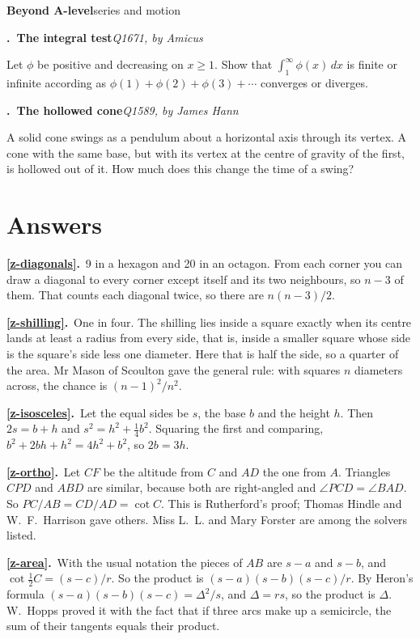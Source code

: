 \documentclass[11pt,a4paper]{article}
\newcounter{prob}
\newcommand{\prob}[3]{\par\bigskip\refstepcounter{prob}\label{#1}%
  \noindent\textbf{\theprob.\ #2}\hfill{\small\textit{#3}}\par\nopagebreak\smallskip}
\newcommand{\ans}[2]{\par\smallskip\noindent\textbf{\ref{#1}.}\ #2}
\newcommand{\band}[3]{%
  \clearpage
  \begin{tcolorbox}[colback=#1!12,colframe=#1,boxrule=1pt,arc=2pt]
  {\Large\bfseries\color{#1} #2}\hfill{\large #3}
  \end{tcolorbox}}
\begin{document}
\band{bandgrey}{Beyond A-level}{series and motion}

\prob{z-test}{The integral test}{Q1671, by Amicus}
Let $\phi$ be positive and decreasing on $x \ge 1$. Show that $\int_1^\infty\phi(x)\,dx$ is
finite or infinite according as $\phi(1) + \phi(2) + \phi(3) + \cdots$ converges or
diverges.

\prob{z-hollow}{The hollowed cone}{Q1589, by James Hann}
A solid cone swings as a pendulum about a horizontal axis through its vertex. A cone with
the same base, but with its vertex at the centre of gravity of the first, is hollowed out
of it. How much does this change the time of a swing?

\clearpage
\section*{Answers}

\ans{z-diagonals}{9 in a hexagon and 20 in an octagon. From each corner you can draw a
diagonal to every corner except itself and its two neighbours, so $n - 3$ of them. That
counts each diagonal twice, so there are $n(n-3)/2$.}

\ans{z-shilling}{One in four. The shilling lies inside a square exactly when its centre
lands at least a radius from every side, that is, inside a smaller square whose side is
the square's side less one diameter. Here that is half the side, so a quarter of the
area. Mr Mason of Scoulton gave the general rule: with squares $n$ diameters across, the
chance is $(n-1)^2/n^2$.}

\ans{z-isosceles}{Let the equal sides be $s$, the base $b$ and the height $h$. Then
$2s = b + h$ and $s^2 = h^2 + \tfrac14b^2$. Squaring the first and comparing,
$b^2 + 2bh + h^2 = 4h^2 + b^2$, so $2b = 3h$.}

\ans{z-ortho}{Let $CF$ be the altitude from $C$ and $AD$ the one from $A$. Triangles $CPD$
and $ABD$ are similar, because both are right-angled and $\angle PCD = \angle BAD$. So
$PC/AB = CD/AD = \cot C$. This is Rutherford's proof; Thomas Hindle and W.~F.~Harrison
gave others. Miss L.~L. and Mary Forster are among the solvers listed.}

\ans{z-area}{With the usual notation the pieces of $AB$ are $s-a$ and $s-b$, and
$\cot\tfrac12C = (s-c)/r$. So the product is $(s-a)(s-b)(s-c)/r$. By Heron's formula
$(s-a)(s-b)(s-c) = \Delta^2/s$, and $\Delta = rs$, so the product is $\Delta$. W.~Hopps
proved it with the fact that if three arcs make up a semicircle, the sum of their tangents
equals their product.}
\end{document}
